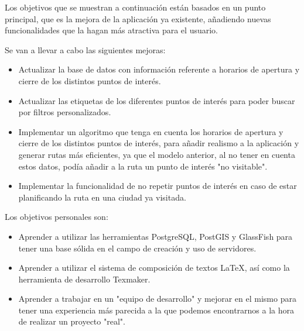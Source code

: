 
Los objetivos que se muestran a continuación están basados en un punto principal, que es la mejora de la aplicación ya existente, añadiendo nuevas funcionalidades que la hagan más atractiva para el usuario.

Se van a llevar a cabo las siguientes mejoras:
\begin{itemize}
\tightlist
\item Actualizar la base de datos con información referente a horarios de apertura y cierre de los distintos puntos de interés.
\item Actualizar las etiquetas de los diferentes puntos de interés para poder buscar por filtros personalizados.
\item Implementar un algoritmo que tenga en cuenta los horarios de apertura y cierre de los distintos puntos de interés, para añadir realismo a la aplicación y generar rutas más eficientes, ya que el modelo anterior, al no tener en cuenta estos datos, podía añadir a la ruta un punto de interés "no visitable".
\item Implementar la funcionalidad de no repetir puntos de interés en caso de estar planificando la ruta en una ciudad ya visitada.
\end{itemize}

Los objetivos personales son:
\begin{itemize}
\tightlist
\item Aprender a utilizar las herramientas PostgreSQL, PostGIS y GlassFish para tener una base sólida en el campo de creación y uso de servidores.
\item Aprender a utilizar el sistema de composición de textos LaTeX, así como la herramienta de desarrollo Texmaker.
\item Aprender a trabajar en un "equipo de desarrollo" y mejorar en el mismo para tener una experiencia más parecida a la que podemos encontrarnos a la hora de realizar un proyecto "real".
\end{itemize}